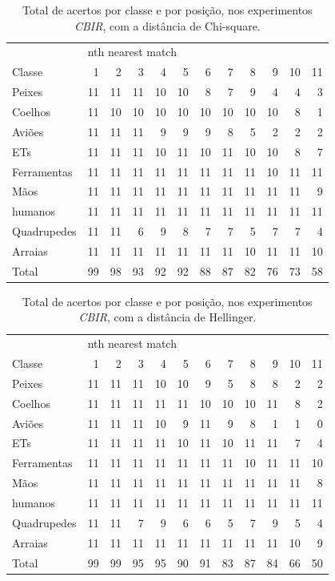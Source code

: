 \begin{table}
\centering
\caption{\label{tab:KimiaChi-square} Total de acertos por classe e por posição, nos experimentos \emph{CBIR}, com a distância de Chi-square.}
\begin{tabular}{l| r r r r r r r r r r r}
\hline
&\multicolumn{11}{l}{nth nearest match} \\
\cline{2-12}
Classe&1&2&3&4&5&6&7&8&9&10&11 \\
 \hline
Peixes&11&11&11&10&10&8&7&9&4&4&3\\
Coelhos&11&10&10&10&10&10&10&10&10&8&1\\ 
Aviões&11&11&11&9&9&9&8&5&2&2&2\\
ETs&11&11&11&10&11&10&11&10&10&8&7\\
Ferramentas&11&11&11&11&11&11&11&11&10&11& 11\\
Mãos&11&11&11&11&11&11&11&11&11&11&9\\
humanos&11&11&11&11&11&11&11&11&11&11&11\\
Quadrupedes&11&11&6&9&8&7&7&5&7&7&4\\
Arraias&11&11&11&11&11&11&11&10&11&11&10\\
\hline
Total&99&98&93&92&92&88&87&82&76&73&58\\
\hline
\end{tabular}
\end{table}

\begin{table}
\centering
\caption{\label{tab:KimiaHellinger} Total de acertos por classe e por posição, nos experimentos \emph{CBIR}, com a distância de Hellinger.}
\begin{tabular}{l| r r r r r r r r r r r}
\hline
&\multicolumn{11}{l}{nth nearest match} \\
\cline{2-12}
Classe&1&2&3&4&5&6&7&8&9&10&11 \\
 \hline
Peixes&11&11&11&10&10&9&5&8&8&2&2\\
Coelhos&11&11&11&11&11&10&10&10&11&8&2\\ 
Aviões&11&11&11&10&9&11&9&8&1&1&0\\
ETs&11&11&11&11&10&11&10&11&11&7&4\\
Ferramentas&11&11&11&11&11&11&11&10&11&11& 10\\
Mãos&11&11&11&11&11&11&11&11&11&11&8\\
humanos&11&11&11&11&11&11&11&11&11&11&11\\
Quadrupedes&11&11&7&9&6&6&5&7&9&5&4\\
Arraias&11&11&11&11&11&11&11&11&11&10&9\\
\hline
Total&99&99&95&95&90&91&83&87&84&66&50\\
\hline
\end{tabular}
\end{table}

